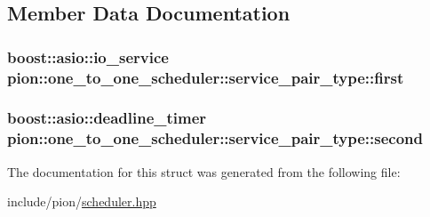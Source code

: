 \subsection{Member Data Documentation}
\hypertarget{structpion_1_1one__to__one__scheduler_1_1service__pair__type_a74fee2ba10cca771f6db6da000b0d9bb}{
\subsubsection[{first}]{\setlength{\rightskip}{0pt plus 5cm}boost\-::asio\-::io\-\_\-service pion\-::one\-\_\-to\-\_\-one\-\_\-scheduler\-::service\-\_\-pair\-\_\-type\-::first}}\label{structpion_1_1one__to__one__scheduler_1_1service__pair__type_a74fee2ba10cca771f6db6da000b0d9bb}
\hypertarget{structpion_1_1one__to__one__scheduler_1_1service__pair__type_ac809326d5069e14a65eb6effb94dac7b}{
\subsubsection[{second}]{\setlength{\rightskip}{0pt plus 5cm}boost\-::asio\-::deadline\-\_\-timer pion\-::one\-\_\-to\-\_\-one\-\_\-scheduler\-::service\-\_\-pair\-\_\-type\-::second}}\label{structpion_1_1one__to__one__scheduler_1_1service__pair__type_ac809326d5069e14a65eb6effb94dac7b}


The documentation for this struct was generated from the following file\-:\begin{DoxyCompactItemize}
\item 
include/pion/\hyperlink{scheduler_8hpp}{scheduler.\-hpp}\end{DoxyCompactItemize}
